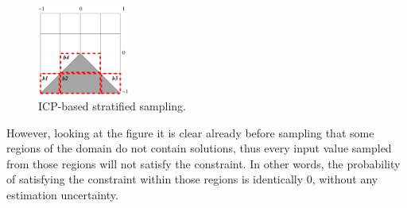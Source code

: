 \begin{figure}[h!]\label{fig:stratifiedICP}
  \centering
      \includegraphics[width=3cm]{triangle}
  \caption{ICP-based stratified sampling.}
\end{figure}

However, looking at the figure it is clear already before sampling that some regions of the domain do not contain solutions, thus every input value sampled from those regions will not satisfy the constraint. In other words, the probability of satisfying the constraint within those regions is identically 0, without any estimation uncertainty. 







